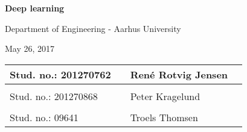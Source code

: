 
\centerline{\Huge\bfseries\color{ThemeColor} Deep learning}

\vspace{5em}
\centerline{\large\bfseries\color{BlackColor}}
\vspace{0.5em}
\centerline{\large\color{BlackColor}Department of Engineering - Aarhus University}

\vspace{0.5em}
\centerline{\large\color{BlackColor} May 26, 2017}



\vspace{25em}

\begin{center}
	\centerline{\large\color{BlackColor} }
	\vspace{5em}
   \begin{tabular}{ l p{3cm} l l }
    Stud. no.: 201270762 && René Rotvig Jensen & \\\hline
	& & \\
	Stud. no.: 201270868 && Peter Kragelund & \\\hline
	& & \\
	Stud. no.: 09641 && Troels Thomsen & \\\hline
   \end{tabular}
\end{center}
\thispagestyle{empty} %
\restoregeometry

